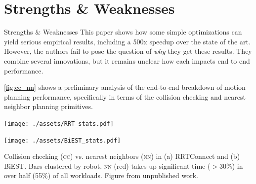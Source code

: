 \documentclass{beamer}
\begin{document}
\section{Strengths \& Weaknesses}
\begin{frame}[allowframebreaks]{Strengths \& Weaknesses}
This paper shows how some simple optimizations can yield serious empirical results, including a 500x speedup over the state of the art. However, the authors   fail to pose the question of \textit{why} they get these results. They combine several innovations, but it remains unclear how each impacts end to end performance.

\ref{fig:cc_nn} shows a preliminary analysis of the end-to-end breakdown of motion planning performance, specifically in terms of the collision checking and nearest neighbor planning primitives.

{
\centering
    \begin{minipage}[c]{.05\textwidth}
    \vspace{0.5cm}
    \end{minipage}%
    \begin{minipage}[c]{.95\textwidth}
        \centering
        \texttt{[image: ./assets/RRT\_stats.pdf]}
    \end{minipage}
    \label{fig:cc_nn_rrtconnect}
    \vspace{-0.2cm}

    \begin{minipage}[c]{.05\textwidth}
    \vspace{-1.7cm}
    \end{minipage}%
    \begin{minipage}[c]{.95\textwidth}
        \centering
        \texttt{[image: ./assets/BiEST\_stats.pdf]}
    \end{minipage}
    \label{fig:cc_nn_biest}
}

Collision checking (\textsc{cc}) vs. nearest neighbors (\textsc{nn}) in (a) RRTConnect and (b) BiEST. Bars clustered by robot. \textsc{nn} (red) takes up significant time ($>$30\%) in over half (55\%) of all workloads. Figure from unpublished work.

\end{frame}
\end{document}
